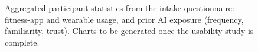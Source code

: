 \begin{figure}[ht]
\centering
{}
\caption[Participant technology and AI profile (placeholder)]{Aggregated participant statistics from the intake questionnaire: fitness-app and wearable usage, and prior AI exposure (frequency, familiarity, trust). Charts to be generated once the usability study is complete.}\label{fig:ux_tech}
\end{figure}
